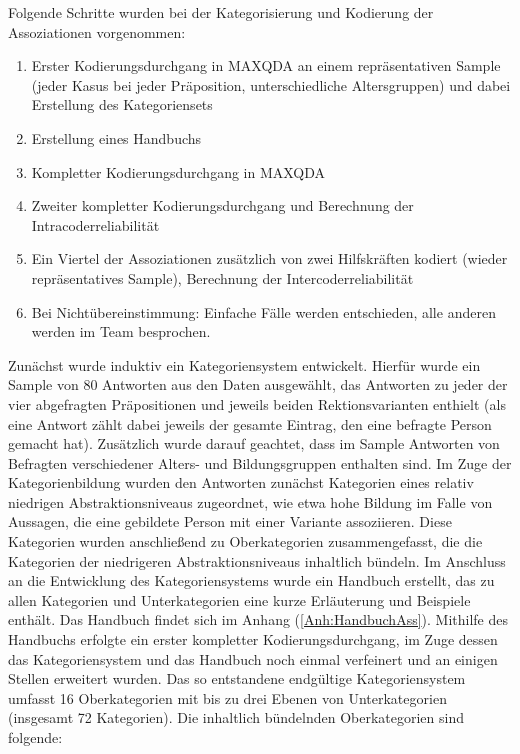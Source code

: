 Folgende Schritte wurden bei der Kategorisierung und Kodierung der Assoziationen vorgenommen: 
\begin{enumerate}
\item Erster Kodierungsdurchgang in MAXQDA an einem repräsentativen Sample  (jeder Kasus bei jeder Präposition, unterschiedliche Altersgruppen) und dabei Erstellung des Kategoriensets
\item Erstellung eines Handbuchs
\item Kompletter Kodierungsdurchgang  in MAXQDA 
\item Zweiter kompletter Kodierungsdurchgang und Berechnung der Intracoderreliabilität
\item Ein Viertel der Assoziationen zusätzlich von zwei Hilfskräften kodiert (wieder repräsentatives Sample), Berechnung der Intercoderreliabilität
\item Bei Nichtübereinstimmung: Einfache Fälle werden entschieden, alle anderen werden im Team besprochen. 
\end{enumerate}
Zunächst wurde induktiv ein Kategoriensystem entwickelt. 
Hierfür wurde ein Sample von 80 Antworten aus den Daten ausgewählt, das Antworten zu jeder der vier abgefragten Präpositionen und jeweils beiden Rektionsvarianten enthielt (als eine Antwort zählt dabei jeweils der gesamte Eintrag, den eine befragte Person gemacht hat). 
Zusätzlich wurde darauf geachtet, dass im Sample Antworten von Befragten verschiedener Alters- und Bildungsgruppen enthalten sind. 
Im Zuge der Kategorienbildung wurden den Antworten zunächst Kategorien eines relativ niedrigen {Abstraktions\-niveaus} zugeordnet, wie etwa \glqq hohe Bildung\grqq{} im Falle von Aussagen, die eine gebildete Person mit einer Variante assoziieren. 
Diese Kategorien wurden anschließend zu Oberkategorien zusammengefasst, die die Kategorien der niedrigeren Abstraktionsniveaus inhaltlich bündeln. 
Im Anschluss an die Entwicklung des Kategoriensystems wurde ein Handbuch erstellt, das zu allen Kategorien und Unterkategorien eine kurze Erläuterung und Beispiele enthält. 
Das Handbuch findet sich im Anhang (\autoref{Anh:HandbuchAss}). 
Mithilfe des Handbuchs erfolgte ein erster kompletter Kodierungsdurchgang, im Zuge dessen das Kategoriensystem und das Handbuch noch einmal verfeinert und an einigen Stellen erweitert wurden. 
Das so entstandene endgültige Kategoriensystem umfasst 16 Oberkategorien mit bis zu drei Ebenen von Unterkategorien (insgesamt 72 Kategorien). 
Die inhaltlich bündelnden Oberkategorien sind folgende: 
